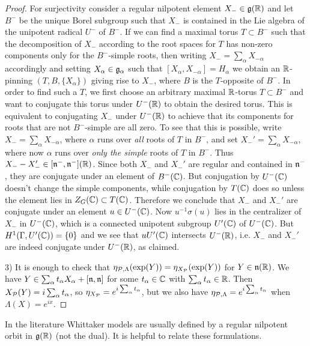 \documentclass{article}
\theoremstyle{definition}
\numberwithin{equation}{section}
\renewcommand{\-}{\hyp{}}
\newcommand{\g}{\mathfrak g}
\begin{document}
\begin{proof}
For surjectivity consider a regular nilpotent element
$X_- \in \mathfrak{g}(\mathbb{R})$ and let $B^-$ be the unique Borel subgroup such
that $X_-$ is contained in the Lie algebra of the unipotent radical
$U^-$ of $B^-$. If we can find a maximal torus $T \subset B^-$ such
that the decomposition of $X_-$ according to the root spaces for $T$
has non-zero components only for the $B^-$-simple roots, then writing
$X_-=\sum_\alpha X_{-\alpha}$ accordingly and setting
$X_\alpha \in \mathfrak{g}_\alpha$ such that
$[X_\alpha,X_{-\alpha}]=H_\alpha$ we obtain an $\mathbb{R}$-pinning
$(T,B,\{X_\alpha\})$ giving rise to $X_-$, where $B$ is the
$T$-opposite of $B^-$. In order to find such a $T$, we first choose an
arbitrary maximal $\mathbb{R}$-torus $T \subset B^-$ and want to conjugate
this torus under $U^-(\mathbb{R})$ to obtain the desired torus. This is
equivalent to conjugating $X_-$ under $U^-(\mathbb{R})$ to achieve that its
components for roots that are not $B^-$-simple are all zero. To see
that this is possible, write $X_-=\sum_\alpha X_{-\alpha}$, where
$\alpha$ runs over \emph{all} roots of $T$ in $B^-$, and set
$X_-'=\sum_\alpha X_{-\alpha}$, where now $\alpha$ runs over
\emph{only the simple} roots of $T$ in $B^-$. Thus
$X_--X_-' \in [\mathfrak{n}^-,\mathfrak{n}^-](\mathbb{R})$. Since both $X_-$ and $X_-'$
are regular and contained in $\mathfrak{n}^-$, they are conjugate under an
element of $B^-(\mathbb{C})$. But conjugation by $U^-(\mathbb{C})$ doesn't change the
simple components, while conjugation by $T(\mathbb{C})$ does so unless the
element lies in $Z_G(\mathbb{C}) \subset T(\mathbb{C})$. Therefore we conclude that
$X_-$ and $X_-'$ are conjugate under an element $u \in U^-(\mathbb{C})$. Now
$u^{-1}\sigma(u)$ lies in the centralizer of $X_-$ in $U^-(\mathbb{C})$, which
is a connected unipotent subgroup $U'(\mathbb{C})$ of $U^-(\mathbb{C})$. But
$H^1(\Gamma,U'(\mathbb{C}))=\{0\}$ and we see that $uU'(\mathbb{C})$ intersects
$U^-(\mathbb{R})$, i.e. $X_-$ and $X_-'$ are indeed conjugate under $U^-(\mathbb{R})$,
as claimed.

3) It is enough to check that $\eta_{\mathcal{P},\Lambda}(\exp(Y))=\eta_{X_{\mathcal{P}}}(\exp(Y))$ for $Y \in \mathfrak{n}(\mathbb{R})$. We have $Y \in \sum_\alpha t_\alpha X_\alpha + [\mathfrak{n},\mathfrak{n}]$ for some $t_\alpha \in \mathbb{C}$ with $\sum_\alpha t_\alpha \in \mathbb{R}$. Then $X_{\mathcal{P}}(Y)=i\sum_\alpha t_\alpha$, so $\eta_{X_{\mathcal{P}}}=e^{i\sum_\alpha t_\alpha}$, but we also have $\eta_{\mathcal{P},\Lambda}=e^{i\sum_\alpha t_\alpha}$ when $\Lambda(X)=e^{ix}$.
\end{proof}



In the literature Whittaker models are usually defined by a regular
nilpotent orbit in $\g(\R)$ (not the dual). It is helpful to relate
these formulations.
\end{document}
